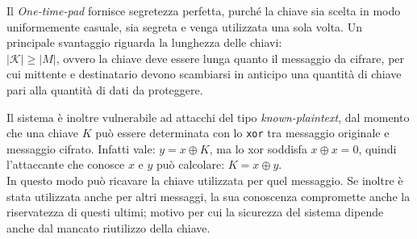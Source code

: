 \noindent Il \textit{One-time-pad} fornisce segretezza perfetta, purché la chiave sia scelta in modo uniformemente casuale, sia segreta e venga utilizzata una sola volta. Un principale svantaggio riguarda la lunghezza delle chiavi:\\ $|\mathcal{K}| \geq |M|$, ovvero la chiave deve essere lunga quanto il messaggio da cifrare, per cui mittente e destinatario devono scambiarsi in anticipo una quantità di chiave pari alla quantità di dati da proteggere.

\vspace{1em}\noindent  Il sistema è inoltre vulnerabile ad attacchi del tipo \emph{known-plaintext}, dal momento che una chiave $K$ può essere determinata con lo \texttt{xor} tra messaggio originale e messaggio cifrato. Infatti vale: $y=x\oplus K$, ma lo xor soddisfa $x\oplus x=0$, quindi l'attaccante che conosce \(x\) e \(y\) può calcolare: $K=x\oplus y$. \\ In questo modo può ricavare la chiave utilizzata per quel messaggio. Se inoltre è stata utilizzata anche per altri messaggi, la sua conoscenza compromette anche la riservatezza di questi ultimi; motivo per cui la sicurezza del sistema dipende anche dal mancato riutilizzo della chiave.




